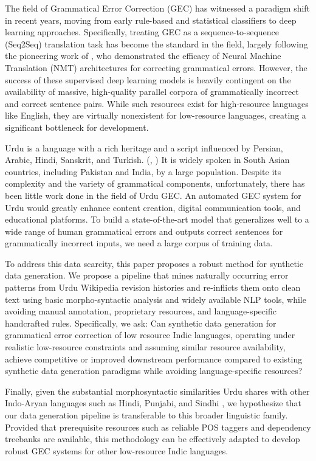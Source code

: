 \documentclass[11pt]{article}
\begin{document}
The field of Grammatical Error Correction (GEC) has witnessed a paradigm shift in recent years, moving from early rule-based and statistical classifiers to deep learning approaches. Specifically, treating GEC as a sequence-to-sequence (Seq2Seq) translation task has become the standard in the field, largely following the pioneering work of \citet{yuan-2016}, who demonstrated the efficacy of Neural Machine Translation (NMT) architectures for correcting grammatical errors. However, the success of these supervised deep learning models is heavily contingent on the availability of massive, high-quality parallel corpora of grammatically incorrect and correct sentence pairs. While such resources exist for high-resource languages like English, they are virtually nonexistent for low-resource languages, creating a significant bottleneck for development.

Urdu is a language with a rich heritage and a script influenced by Persian, Arabic, Hindi, Sanskrit, and Turkish. (\cite{ButtAhmed2011}, \cite{Mangrio2016Loanwords}) It is widely spoken in South Asian countries, including Pakistan and India, by a large population. Despite its complexity and the variety of grammatical components, unfortunately, there has been little work done in the field of Urdu GEC. An automated GEC system for Urdu would greatly enhance content creation, digital communication tools, and educational platforms. To build a state-of-the-art model that generalizes well to a wide range of human grammatical errors and outputs correct sentences for grammatically incorrect inputs, we need a large corpus of training data.

To address this data scarcity, this paper proposes a robust method for synthetic data generation. We propose a pipeline that mines naturally occurring error patterns from Urdu Wikipedia revision histories and re-inflicts them onto clean text using basic morpho-syntactic analysis and widely available NLP tools, while avoiding manual annotation, proprietary resources, and language-specific handcrafted rules. Specifically, we ask: Can synthetic data generation for grammatical error correction of low resource Indic languages, operating under realistic low-resource constraints and assuming similar resource availability, achieve competitive or improved downstream performance compared to existing synthetic data generation paradigms while avoiding language-specific resources?

Finally, given the substantial morphosyntactic similarities Urdu shares with other Indo-Aryan languages such as Hindi, Punjabi, and Sindhi \citep{ButtAhmed2011, Mangrio2021MorphoPhonological}, we hypothesize that our data generation pipeline is transferable to this broader linguistic family. Provided that prerequisite resources such as reliable POS taggers and dependency treebanks are available, this methodology can be effectively adapted to develop robust GEC systems for other low-resource Indic languages.
\end{document}
